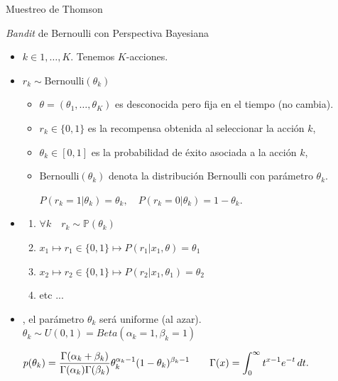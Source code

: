 \documentclass[10pt, envcountsect, handout, aspectratio=1610, hyperref={hypertexnames=true}]{beamer}
\begin{document}
\begin{frame}{Muestreo de Thomson}
\begin{itemize}
\end{itemize}
\end{frame}



\begin{frame}{\textit{Bandit} de Bernoulli con Perspectiva Bayesiana}


\begin{itemize}
	\item $k\in{1, \ldots, K}$. Tenemos $K$-acciones.
	\item $r_k \sim \text{Bernoulli}(\theta_k)$

	\begin{itemize}
		\item $\theta=(\theta_1,\ldots, \theta_K)$ es desconocida pero fija en el tiempo (no cambia).
	    \item \(r_k \in \{0, 1\}\) es la recompensa obtenida al seleccionar la acción \(k\),
    	\item \(\theta_k \in [0, 1]\) es la probabilidad de éxito asociada a la acción \(k\),
    	\item \(\text{Bernoulli}(\theta_k)\) denota la distribución Bernoulli con parámetro \(\theta_k\).
	
		\hfil \(P(r_k = 1 | \theta_k) = \theta_k, \quad P(r_k = 0 | \theta_k) = 1 - \theta_k. \)

    \end{itemize}
    
    \item \begin{enumerate}
    \item $\forall k \quad r_k \sim \mathbb{P}(\theta_k)$  
    \item $x_1 \mapsto r_1 \in \{0, 1\} \mapsto P(r_1 | x_1, \theta) = \theta_1$
	\item $x_2 \mapsto r_2 \in \{0, 1\} \mapsto P(r_2 | x_1, \theta_1) = \theta_2$
    \item etc ...
    \end{enumerate}
    
    \item {}, el parámetro $\theta_k$ será uniforme (al azar). $\theta_k \sim U(0, 1)=Beta(\alpha_k=1,\beta_k=1)$
    
    \hfil\( p(\theta_k) = \displaystyle \frac{\Gamma(\alpha_k + \beta_k)}{\Gamma(\alpha_k)\Gamma(\beta_k)} \theta_k^{\alpha_k - 1}(1 - \theta_k)^{\beta_k - 1}\qquad  \Gamma(x) = \int_{0}^{\infty} t^{x-1} e^{-t} \, dt.\)
    

\end{itemize}
\end{frame}
\end{document}
